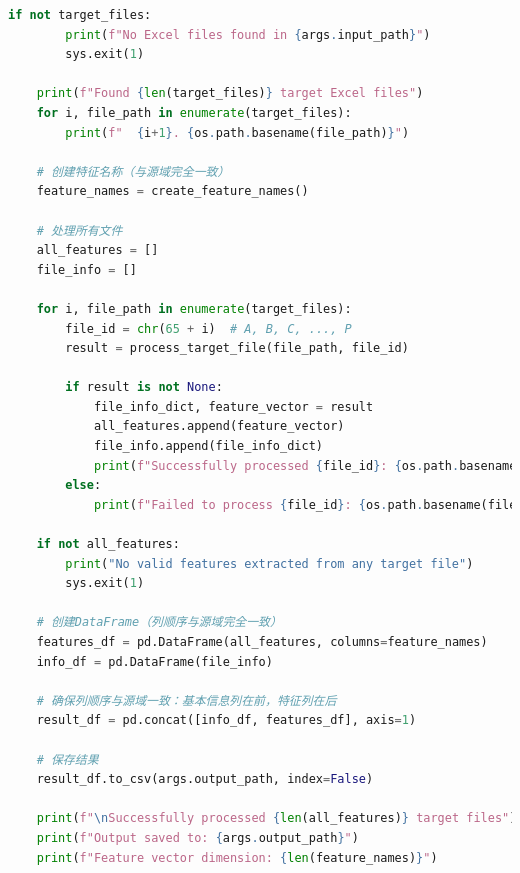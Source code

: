 \documentclass[a4paper]{CPIPC}
\numberwithin{equation}{section}
\begin{document}
\begin{lstlisting}[language=Python, caption=Target Domain Feature Extraction]
    if not target_files:
        print(f"No Excel files found in {args.input_path}")
        sys.exit(1)
    
    print(f"Found {len(target_files)} target Excel files")
    for i, file_path in enumerate(target_files):
        print(f"  {i+1}. {os.path.basename(file_path)}")
    
    # 创建特征名称（与源域完全一致）
    feature_names = create_feature_names()
    
    # 处理所有文件
    all_features = []
    file_info = []
    
    for i, file_path in enumerate(target_files):
        file_id = chr(65 + i)  # A, B, C, ..., P
        result = process_target_file(file_path, file_id)
        
        if result is not None:
            file_info_dict, feature_vector = result
            all_features.append(feature_vector)
            file_info.append(file_info_dict)
            print(f"Successfully processed {file_id}: {os.path.basename(file_path)}")
        else:
            print(f"Failed to process {file_id}: {os.path.basename(file_path)}")
    
    if not all_features:
        print("No valid features extracted from any target file")
        sys.exit(1)
    
    # 创建DataFrame（列顺序与源域完全一致）
    features_df = pd.DataFrame(all_features, columns=feature_names)
    info_df = pd.DataFrame(file_info)
    
    # 确保列顺序与源域一致：基本信息列在前，特征列在后
    result_df = pd.concat([info_df, features_df], axis=1)
    
    # 保存结果
    result_df.to_csv(args.output_path, index=False)
    
    print(f"\nSuccessfully processed {len(all_features)} target files")
    print(f"Output saved to: {args.output_path}")
    print(f"Feature vector dimension: {len(feature_names)}")
\end{lstlisting}
\end{document}

